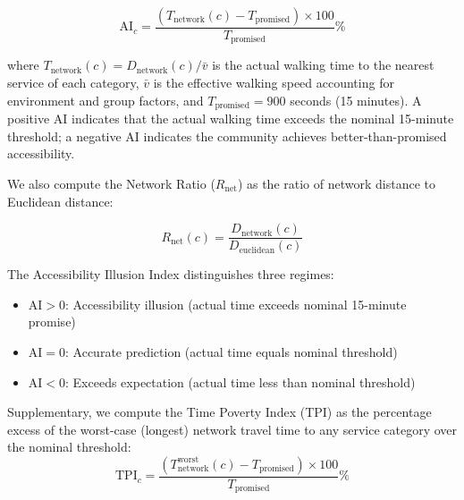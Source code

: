 \documentclass[10pt,conference,compsoc]{IEEEtran}
\begin{document}
\begin{equation}
\text{AI}_c = \frac{(T_{\text{network}}(c) - T_{\text{promised}}) \times 100}{T_{\text{promised}}}\%
\label{eq:ai_index}
\end{equation}

where $T_{\text{network}}(c) = D_{\text{network}}(c) / \bar{v}$ is the actual walking time to the nearest service of each category, $\bar{v}$ is the effective walking speed accounting for environment and group factors, and $T_{\text{promised}} = 900$ seconds (15 minutes). A positive AI indicates that the actual walking time exceeds the nominal 15-minute threshold; a negative AI indicates the community achieves better-than-promised accessibility.

We also compute the Network Ratio ($R_{\text{net}}$) as the ratio of network distance to Euclidean distance:

\begin{equation}
R_{\text{net}}(c) = \frac{D_{\text{network}}(c)}{D_{\text{euclidean}}(c)}
\label{eq:network_ratio}
\end{equation}

The Accessibility Illusion Index distinguishes three regimes:
\begin{itemize}
    \item \textbf{$\text{AI} > 0$}: Accessibility illusion (actual time exceeds nominal 15-minute promise)
    \item \textbf{$\text{AI} = 0$}: Accurate prediction (actual time equals nominal threshold)
    \item \textbf{$\text{AI} < 0$}: Exceeds expectation (actual time less than nominal threshold)
\end{itemize}

Supplementary, we compute the Time Poverty Index (TPI) as the percentage excess of the worst-case (longest) network travel time to any service category over the nominal threshold:
\begin{equation}
\text{TPI}_c = \frac{(T_{\text{network}}^{\text{worst}}(c) - T_{\text{promised}}) \times 100}{T_{\text{promised}}}\%
\end{equation}
\end{document}
